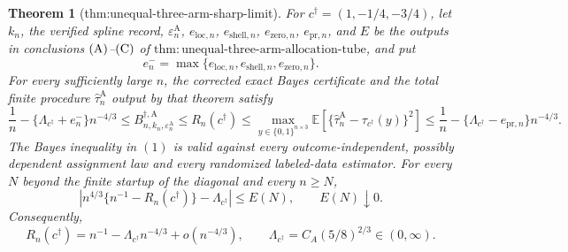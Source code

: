 \documentclass{article}
\newtheorem{theorem}{Theorem}
\begin{document}
\begin{theorem}[thm:unequal-three-arm-sharp-limit]\label{thm:unequal-three-arm-sharp-limit}
For \(c^\dagger=(1,-1/4,-3/4)\), let \(k_n\), the verified spline record, \(\varepsilon_n^{\mathrm A}\), \(e_{\mathrm{loc},n}\), \(e_{\mathrm{shell},n}\), \(e_{\mathrm{zero},n}\), \(e_{\mathrm{pr},n}\), and \(E\) be the outputs in conclusions \({\rm(A)}\)--\({\rm(C)}\) of \(\mathrm{thm:unequal\text{-}three\text{-}arm\text{-}allocation\text{-}tube}\), and put
\[
 e_n^- = \max\{e_{\mathrm{loc},n},e_{\mathrm{shell},n},e_{\mathrm{zero},n}\}.
\]
For every sufficiently large \(n\), the corrected exact Bayes certificate and the total finite procedure \(\widehat\tau_n^{\mathrm A}\) output by that theorem satisfy
\[
 \frac1n-\{\Lambda_{c^\dagger}+e_n^-\}n^{-4/3}
 \le B_{n,k_n,\varepsilon_n^{\mathrm A}}^{\dagger,\mathrm A}
 \le R_n(c^\dagger)
 \le \max_{y\in\{0,1\}^{n\times3}}
       \mathbb E\!\left[
       \{\widehat\tau_n^{\mathrm A}-\tau_{c^\dagger}(y)\}^2
       \right]
 \le \frac1n-\{\Lambda_{c^\dagger}-e_{\mathrm{pr},n}\}n^{-4/3}.
 \tag{1}
\]
The Bayes inequality in \((1)\) is valid against every outcome-independent, possibly dependent assignment law and every randomized labeled-data estimator.  For every \(N\) beyond the finite startup of the diagonal and every \(n\ge N\),
\[
 \left|n^{4/3}\{n^{-1}-R_n(c^\dagger)\}
       -\Lambda_{c^\dagger}\right|\le E(N),
 \qquad E(N)\downarrow0.
 \tag{2}
\]
Consequently,
\[
 R_n(c^\dagger)=n^{-1}-\Lambda_{c^\dagger}n^{-4/3}
 +o(n^{-4/3}),
 \qquad
 \Lambda_{c^\dagger}=C_A(5/8)^{2/3}\in(0,\infty).
\]
\end{theorem}
\end{document}
